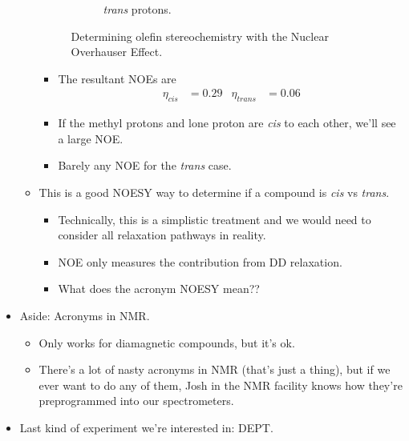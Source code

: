 \documentclass[../notes.tex]{subfiles}
\begin{document}
\begin{itemize}
\begin{itemize}
\begin{figure}[H]
\begin{subfigure}[b]{0.3\linewidth}
                \label{fig:NOEcisTransa}
            \end{subfigure}
            \begin{subfigure}[b]{0.3\linewidth}
                \centering
                \caption{\emph{trans} protons.}
                \label{fig:NOEcisTransb}
            \end{subfigure}
            \caption{Determining olefin stereochemistry with the Nuclear Overhauser Effect.}
            \label{fig:NOEcisTrans}
        \end{figure}
        \begin{itemize}
            \item The resultant NOEs are
            \begin{align*}
                \eta_\textit{cis} &= 0.29&
                \eta_\textit{trans} &= 0.06
            \end{align*}
            \item If the methyl protons and lone proton are \emph{cis} to each other, we'll see a large NOE.
            \item Barely any NOE for the \emph{trans} case.
        \end{itemize}
        \item This is a good NOESY way to determine if a compound is \emph{cis} vs \emph{trans}.
        \begin{itemize}
            \item Technically, this is a simplistic treatment and we would need to consider all relaxation pathways in reality.
            \item NOE only measures the contribution from DD relaxation.
            \item What does the acronym NOESY mean??
        \end{itemize}
    \end{itemize}
    \item Aside: Acronyms in NMR.
    \begin{itemize}
        \item Only works for diamagnetic compounds, but it's ok.
        \item There's a lot of nasty acronyms in NMR (that's just a thing), but if we ever want to do any of them, Josh in the NMR facility knows how they're preprogrammed into our spectrometers.
    \end{itemize}
    \item Last kind of experiment we're interested in: DEPT.

\end{itemize}
\end{document}
